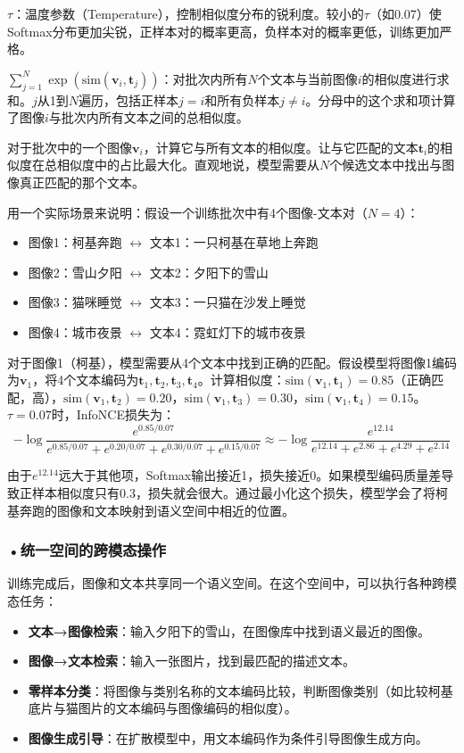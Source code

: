 $\tau$：温度参数（Temperature），控制相似度分布的锐利度。较小的$\tau$（如0.07）使Softmax分布更加尖锐，正样本对的概率更高，负样本对的概率更低，训练更加严格。

$\sum_{j=1}^{N} \exp(\text{sim}(\mathbf{v}_i, \mathbf{t}_j))$：对批次内所有$N$个文本与当前图像$i$的相似度进行求和。$j$从1到$N$遍历，包括正样本$j=i$和所有负样本$j \neq i$。分母中的这个求和项计算了图像$i$与批次内所有文本之间的总相似度。

对于批次中的一个图像$\mathbf{v}_i$，计算它与所有文本的相似度。让与它匹配的文本$\mathbf{t}_i$的相似度在总相似度中的占比最大化。直观地说，模型需要从$N$个候选文本中找出与图像真正匹配的那个文本。

用一个实际场景来说明：假设一个训练批次中有4个图像-文本对（$N=4$）：
\begin{itemize}
\item 图像1：柯基奔跑 $\leftrightarrow$ 文本1：一只柯基在草地上奔跑
\item 图像2：雪山夕阳 $\leftrightarrow$ 文本2：夕阳下的雪山
\item 图像3：猫咪睡觉 $\leftrightarrow$ 文本3：一只猫在沙发上睡觉
\item 图像4：城市夜景 $\leftrightarrow$ 文本4：霓虹灯下的城市夜景
\end{itemize}

对于图像1（柯基），模型需要从4个文本中找到正确的匹配。假设模型将图像1编码为$\mathbf{v}_1$，将4个文本编码为$\mathbf{t}_1, \mathbf{t}_2, \mathbf{t}_3, \mathbf{t}_4$。计算相似度：$\text{sim}(\mathbf{v}_1, \mathbf{t}_1)=0.85$（正确匹配，高），$\text{sim}(\mathbf{v}_1, \mathbf{t}_2)=0.20$，$\text{sim}(\mathbf{v}_1, \mathbf{t}_3)=0.30$，$\text{sim}(\mathbf{v}_1, \mathbf{t}_4)=0.15$。$\tau=0.07$时，InfoNCE损失为：
\[
-\log \frac{e^{0.85/0.07}}{e^{0.85/0.07} + e^{0.20/0.07} + e^{0.30/0.07} + e^{0.15/0.07}} \approx -\log \frac{e^{12.14}}{e^{12.14} + e^{2.86} + e^{4.29} + e^{2.14}}
\]

由于$e^{12.14}$远大于其他项，Softmax输出接近1，损失接近0。如果模型编码质量差导致正样本相似度只有0.3，损失就会很大。通过最小化这个损失，模型学会了将柯基奔跑的图像和文本映射到语义空间中相近的位置。

\subsubsection*{\textbf{•统一空间的跨模态操作}}

训练完成后，图像和文本共享同一个语义空间。在这个空间中，可以执行各种跨模态任务：
\begin{itemize}
\item \textbf{文本→图像检索}：输入夕阳下的雪山，在图像库中找到语义最近的图像。
\item \textbf{图像→文本检索}：输入一张图片，找到最匹配的描述文本。
\item \textbf{零样本分类}：将图像与类别名称的文本编码比较，判断图像类别（如比较柯基底片与猫图片的文本编码与图像编码的相似度）。
\item \textbf{图像生成引导}：在扩散模型中，用文本编码作为条件引导图像生成方向。
\end{itemize}

